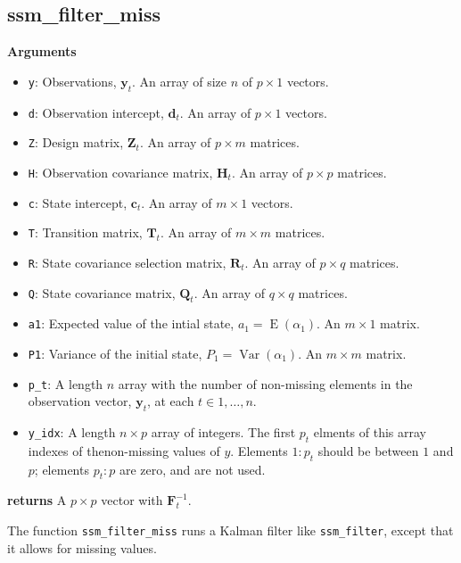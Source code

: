 \documentclass[]{book}
\providecommand{\tightlist}{%
  \setlength{\itemsep}{0pt}\setlength{\parskip}{0pt}}
\DeclareMathOperator{\E}{E}
\DeclareMathOperator{\Var}{Var}
\newcommand{\mat}[1]{\boldsymbol{#1}}
\renewcommand{\vec}[1]{\boldsymbol{#1}}
\begin{document}
\subsection{ssm\_filter\_miss}\label{ssm_filter_miss}

\textbf{Arguments}

\begin{itemize}
\tightlist
\item
  \texttt{y}: Observations, \(\vec{y}_t\). An array of size \(n\) of
  \(p \times 1\) vectors.
\item
  \texttt{d}: Observation intercept, \(\vec{d}_t\). An array of
  \(p \times 1\) vectors.
\item
  \texttt{Z}: Design matrix, \(\mat{Z}_t\). An array of \(p \times m\)
  matrices.
\item
  \texttt{H}: Observation covariance matrix, \(\mat{H}_t\). An array of
  \(p \times p\) matrices.
\item
  \texttt{c}: State intercept, \(\vec{c}_t\). An array of \(m \times 1\)
  vectors.
\item
  \texttt{T}: Transition matrix, \(\mat{T}_t\). An array of
  \(m \times m\) matrices.
\item
  \texttt{R}: State covariance selection matrix, \(\mat{R} _t\). An
  array of \(p \times q\) matrices.
\item
  \texttt{Q}: State covariance matrix, \(\mat{Q}_t\). An array of
  \(q \times q\) matrices.
\item
  \texttt{a1}: Expected value of the intial state,
  \(a_1 = \E(\alpha_1)\). An \(m \times 1\) matrix.
\item
  \texttt{P1}: Variance of the initial state, \(P_1 = \Var(\alpha_1)\).
  An \(m \times m\) matrix.
\item
  \texttt{p\_t}: A length \(n\) array with the number of non-missing
  elements in the observation vector, \(\vec{y}_t\), at each
  \(t \in 1, \dots, n\).
\item
  \texttt{y\_idx}: A length \(n \times p\) array of integers. The first
  \(p_t\) elments of this array indexes of thenon-missing values of
  \(y\). Elements \(1:p_t\) should be between \(1\) and \(p\); elements
  \(p_t:p\) are zero, and are not used.
\end{itemize}

\textbf{returns} A \(p \times p\) vector with \(\mat{F}^{-1}_t\).

The function \texttt{ssm\_filter\_miss} runs a Kalman filter like
\texttt{ssm\_filter}, except that it allows for missing values.
\end{document}
